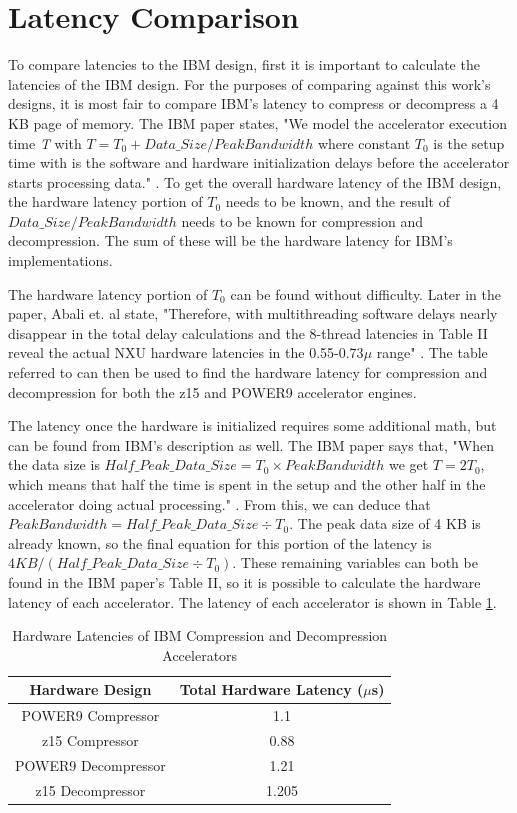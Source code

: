 \documentclass[doublespace,nopageskip]{VTthesis}
\begin{document}
\section{Latency Comparison}\label{se:latency_comparison}
To compare latencies to the IBM design, first it is important to calculate the latencies of the IBM design. For the purposes of comparing against this work's designs, it is most fair to compare IBM's latency to compress or decompress a 4 KB page of memory. The IBM paper states, "We model the accelerator execution time \emph{T} with $T=T_{0}+Data\_Size/PeakBandwidth$ where constant \emph{$T_{0}$} is the setup time with is the software and hardware initialization delays before the accelerator starts processing data." \cite{ibm}. To get the overall hardware latency of the IBM design, the hardware latency portion of \emph{$T_{0}$} needs to be known, and the result of $Data\_Size/PeakBandwidth$ needs to be known for compression and decompression. The sum of these will be the hardware latency for IBM's implementations.

The hardware latency portion of \emph{$T_{0}$} can be found without difficulty. Later in the paper, Abali et. al state, "Therefore, with multithreading software delays nearly disappear in the total delay calculations and the 8-thread latencies in Table II reveal the actual NXU hardware latencies in the 0.55-0.73\emph{$\mu$} range" \cite{ibm}. The table referred to can then be used to find the hardware latency for compression and decompression for both the z15 and POWER9 accelerator engines.

The latency once the hardware is initialized requires some additional math, but can be found from IBM's description as well. The IBM paper says that, "When the data size is $Half\_Peak\_Data\_Size=T_{0} \times PeakBandwidth$ we get $T=2T_{0}$, which means that half the time is spent in the setup and the other half in the accelerator doing actual processing." \cite{ibm}. From this, we can deduce that $PeakBandwidth=Half\_Peak\_Data\_Size \div T_{0}$. The peak data size of 4 KB is already known, so the final equation for this portion of the latency is $4KB/(Half\_Peak\_Data\_Size \div T_{0})$. These remaining variables can both be found in the IBM paper's Table II, so it is possible to calculate the hardware latency of each accelerator. The latency of each accelerator is shown in Table \ref{tab:ibm_latencies}.

\begin{table}[htb]
	\centering
	\caption{Hardware Latencies of IBM Compression and Decompression Accelerators}
	\begin{tabular}{cc}
	    \toprule
	    Hardware Design & Total Hardware Latency ($\mu$s) \\
		\midrule
		POWER9 Compressor & 1.1 \\
		\midrule
		z15 Compressor & 0.88 \\
		\midrule
		POWER9 Decompressor & 1.21 \\
		\midrule
		z15 Decompressor & 1.205 \\
		\bottomrule
	\end{tabular}
	\label{tab:ibm_latencies}
\end{table}
\end{document}
